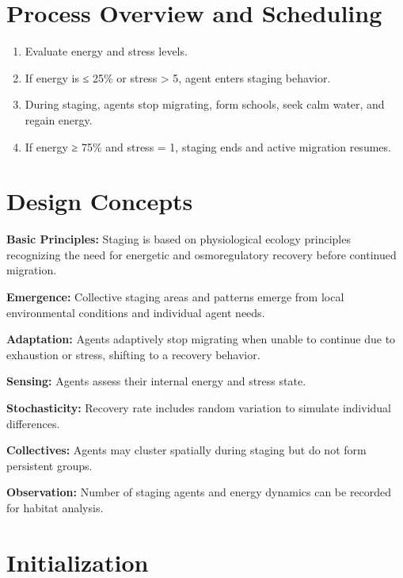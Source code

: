 \documentclass[
]{book}
\begin{document}
\section{Process Overview and Scheduling}\label{process-overview-and-scheduling-6}

\begin{enumerate}
\def\labelenumi{\arabic{enumi}.}
\item
  Evaluate energy and stress levels.
\item
  If energy is ≤ 25\% or stress \textgreater{} 5, agent enters staging behavior.
\item
  During staging, agents stop migrating, form schools, seek calm water, and regain energy.
\item
  If energy ≥ 75\% and stress = 1, staging ends and active migration resumes.
\end{enumerate}

\section{Design Concepts}\label{design-concepts-6}

\textbf{Basic Principles:} Staging is based on physiological ecology principles recognizing the need for energetic and osmoregulatory recovery before continued migration.

\textbf{Emergence:} Collective staging areas and patterns emerge from local environmental conditions and individual agent needs.

\textbf{Adaptation:} Agents adaptively stop migrating when unable to continue due to exhaustion or stress, shifting to a recovery behavior.

\textbf{Sensing:} Agents assess their internal energy and stress state.

\textbf{Stochasticity:} Recovery rate includes random variation to simulate individual differences.

\textbf{Collectives:} Agents may cluster spatially during staging but do not form persistent groups.

\textbf{Observation:} Number of staging agents and energy dynamics can be recorded for habitat analysis.

\section{Initialization}\label{initialization-6}
\end{document}
